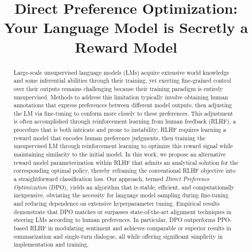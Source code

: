 \title{Direct Preference Optimization: Your Language Model is Secretly a Reward Model}

\begin{abstract}
Large-scale unsupervised language models (LMs) acquire extensive world knowledge and some inferential abilities through their training, yet exerting fine-grained control over their outputs remains challenging because their training paradigm is entirely unsupervised. Methods to address this limitation typically involve obtaining human annotations that express preferences between different model outputs, then adjusting the LM via fine-tuning to conform more closely to these preferences. This adjustment is often accomplished through reinforcement learning from human feedback (RLHF), a procedure that is both intricate and prone to instability; RLHF requires learning a reward model that encodes human preference judgments, then training the unsupervised LM through reinforcement learning to optimize this reward signal while maintaining similarity to the initial model. In this work, we propose an alternative reward model parameterization within RLHF that admits an analytical solution for the corresponding optimal policy, thereby reframing the conventional RLHF objective into a straightforward classification loss. Our approach, termed \textit{Direct Preference Optimization} (DPO), yields an algorithm that is stable, efficient, and computationally inexpensive, obviating the necessity for language model sampling during fine-tuning and reducing dependence on extensive hyperparameter tuning. Empirical results demonstrate that DPO matches or surpasses state-of-the-art alignment techniques in steering LMs according to human preferences. In particular, DPO outperforms PPO-based RLHF in modulating sentiment and achieves comparable or superior results in summarization and single-turn dialogue, all while offering significant simplicity in implementation and training.
\end{abstract}

